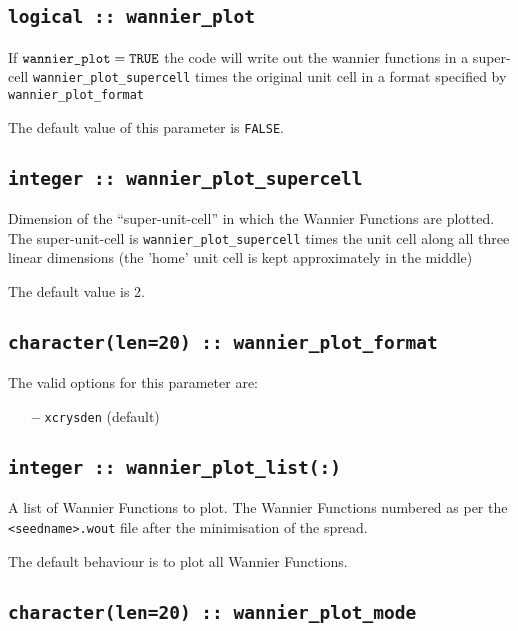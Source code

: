 \subsection[wannier\_plot]{\tt logical :: wannier\_plot}

If $\verb#wannier_plot#=\verb#TRUE#$ the code will write out the
wannier functions in a super-cell \verb#wannier_plot_supercell# times
the original unit cell in a format specified by
\verb#wannier_plot_format#

The default value of this parameter is \verb#FALSE#.

\subsection[wannier\_plot\_supercell]{\tt integer :: wannier\_plot\_supercell}

Dimension of the ``super-unit-cell'' in which the Wannier Functions are plotted.
The super-unit-cell is \verb#wannier_plot_supercell# times the unit cell along all three
linear dimensions (the 'home' unit cell is kept approximately
in the middle)

The default value is 2.

\subsection[wannier\_plot\_format]{\tt character(len=20) :: wannier\_plot\_format}

The valid options for this parameter are:
\begin{itemize}
\item[{\bf --}] \verb#xcrysden# (default)
\end{itemize}

\subsection[wannier\_plot\_list]{\tt integer :: wannier\_plot\_list(:)}

 A list of Wannier Functions to plot. The Wannier Functions numbered as per the
 {\tt <seedname>.wout} file after the minimisation of the spread.

 The default behaviour is to plot all Wannier Functions.

\subsection[wannier\_plot\_mode]{\tt character(len=20) :: wannier\_plot\_mode}

